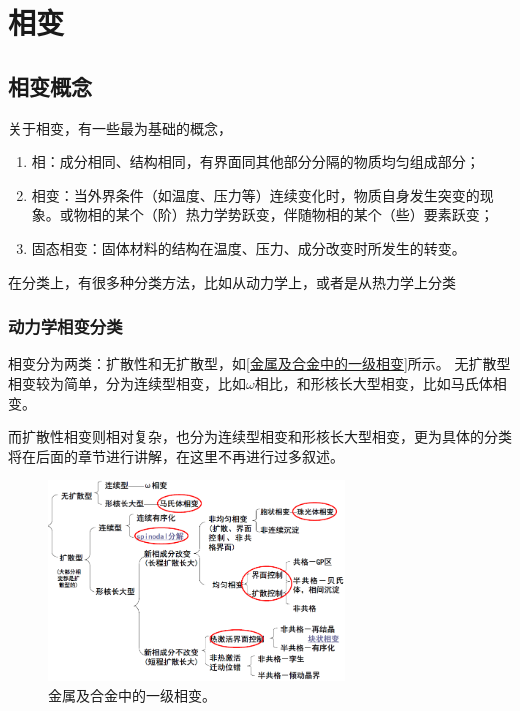 \chapter{相变}
    \section{相变概念}
        关于相变，有一些最为基础的概念，
        \begin{enumerate}
            \item 相：成分相同、结构相同，有界面同其他部分分隔的物质均匀组成部分；
            \item 相变：当外界条件（如温度、压力等）连续变化时，物质自身发生突变的现象。或物相的某个（阶）热力学势跃变，伴随物相的某个（些）要素跃变；
            \item 固态相变：固体材料的结构在温度、压力、成分改变时所发生的转变。
        \end{enumerate}

        在分类上，有很多种分类方法，比如从动力学上，或者是从热力学上分类
            \subsection{动力学相变分类}
                相变分为两类：扩散性和无扩散型，如\autoref{金属及合金中的一级相变}所示。
                无扩散型相变较为简单，分为连续型相变，比如$\omega$相比，和形核长大型相变，比如马氏体相变。

                而扩散性相变则相对复杂，也分为连续型相变和形核长大型相变，更为具体的分类将在后面的章节进行讲解，在这里不再进行过多叙述。
                \begin{figure}[ht]
                    \centering
                    \includegraphics[width=0.7\textwidth]{fig/first_phase_transformation_in_alloys.png}
                    \caption{金属及合金中的一级相变。}
                    \label{金属及合金中的一级相变}
                \end{figure}
